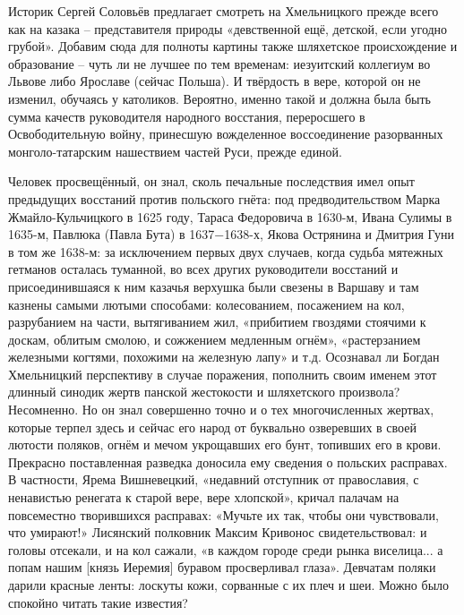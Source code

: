 Историк Сергей Соловьёв предлагает смотреть на Хмельницкого прежде всего как на
казака – представителя природы «девственной ещё, детской, если угодно грубой».
Добавим сюда для полноты картины также шляхетское происхождение и образование –
чуть ли не лучшее по тем временам: иезуитский коллегиум во Львове либо Ярославе
(сейчас Польша). И твёрдость в вере, которой он не изменил, обучаясь у
католиков. Вероятно, именно такой и должна была быть сумма качеств руководителя
народного восстания, переросшего в Освободительную войну, принесшую вожделенное
воссоединение разорванных монголо-татарским нашествием частей Руси, прежде
единой.

Человек просвещённый, он знал, сколь печальные последствия имел опыт предыдущих
восстаний против польского гнёта: под предводительством Марка
Жмайло-Кульчицкого в 1625 году, Тараса Федоровича в 1630-м, Ивана Сулимы в
1635-м, Павлюка (Павла Бута) в 1637−1638-х,  Якова Острянина и Дмитрия Гуни в
том же 1638-м: за исключением первых двух случаев, когда судьба мятежных
гетманов осталась туманной, во всех других руководители восстаний и
присоединившаяся к ним казачья верхушка были свезены в Варшаву и там казнены
самыми лютыми способами: колесованием, посажением на кол, разрубанием на части,
вытягиванием жил, «прибитием гвоздями стоячими к доскам, облитым смолою, и
сожжением медленным огнём», «растерзанием железными когтями, похожими на
железную лапу» и т.д. Осознавал ли Богдан Хмельницкий перспективу в случае
поражения, пополнить своим именем этот длинный синодик жертв панской жестокости
и шляхетского произвола? Несомненно. Но он знал совершенно точно и о тех
многочисленных жертвах, которые терпел здесь и сейчас его народ от буквально
озверевших в своей лютости поляков, огнём и мечом укрощавших его бунт, топивших
его в крови. Прекрасно поставленная разведка доносила ему сведения о польских
расправах. В частности, Ярема Вишневецкий, «недавний отступник от православия,
с ненавистью ренегата к старой вере, вере хлопской», кричал палачам на
повсеместно творившихся расправах: «Мучьте их так, чтобы они чувствовали, что
умирают!» Лисянский полковник Максим Кривонос свидетельствовал: и головы
отсекали, и на кол сажали, «в каждом городе среди рынка виселица... а попам нашим
[князь Иеремия] буравом просверливал глаза». Девчатам поляки дарили красные
ленты: лоскуты кожи, сорванные с их плеч и шеи. Можно было спокойно читать
такие известия?


